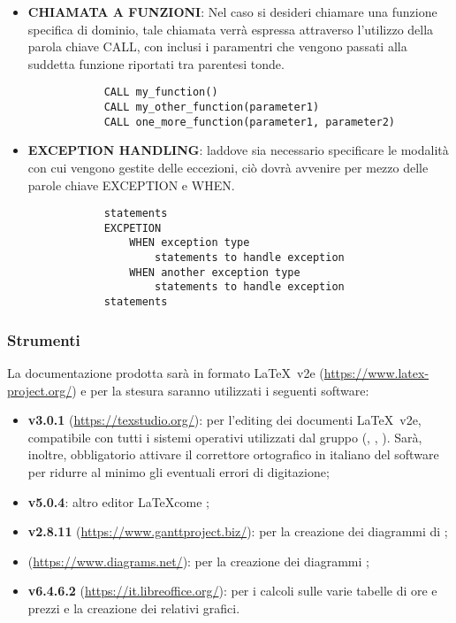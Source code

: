 \begin{itemize}
	\item \textbf{CHIAMATA A FUNZIONI}: Nel caso si desideri chiamare una funzione specifica di dominio, tale chiamata verrà espressa attraverso l'utilizzo della parola chiave CALL, con inclusi i paramentri che vengono passati alla suddetta funzione riportati tra parentesi tonde.
		\begin{verbatim}
			CALL my_function()
			CALL my_other_function(parameter1)
			CALL one_more_function(parameter1, parameter2)
		\end{verbatim}
		
	\item \textbf{EXCEPTION HANDLING}: laddove sia necessario specificare le modalità con cui vengono gestite delle eccezioni, ciò dovrà avvenire per mezzo delle parole chiave EXCEPTION e WHEN.
		\begin{verbatim}
			statements
			EXCPETION
				WHEN exception type
					statements to handle exception
				WHEN another exception type
					statements to handle exception
			statements
		\end{verbatim}
	\end{itemize}
		
	\subsubsection{Strumenti}
	La documentazione prodotta sarà in formato \LaTeX\ v2e (\url{https://www.latex-project.org/}) e per la stesura saranno utilizzati i seguenti software:
	\begin{itemize}
		\item \textbf{ v3.0.1} (\url{https://texstudio.org/}): per l'editing dei documenti \LaTeX\ v2e, compatibile con tutti i sistemi operativi utilizzati dal gruppo (, , ). Sarà, inoltre, obbligatorio attivare il correttore ortografico in italiano del software per ridurre al minimo gli eventuali errori di digitazione;
		\item \textbf{ v5.0.4}: altro editor \LaTeX come ;
		\item \textbf{ v2.8.11} (\url{https://www.ganttproject.biz/}): per la creazione dei diagrammi di ;
		\item \textbf{} (\url{https://www.diagrams.net/}): per la creazione dei diagrammi ;
		\item \textbf{ v6.4.6.2} (\url{https://it.libreoffice.org/}): per i calcoli sulle varie tabelle di ore  e prezzi e la creazione dei relativi grafici.
	\end{itemize}

